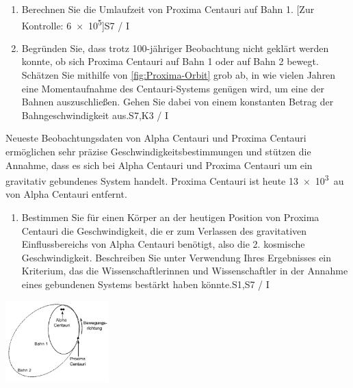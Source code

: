 \begin{aufgabe}[sidebyside, sidebyside align = top,righthand width=3cm]
	\begin{enumerate}
	 	\item Berechnen Sie die Umlaufzeit von Proxima Centauri auf Bahn 1.\newline
		 \hfill [Zur Kontrolle: \SI{6e5}{\year}]\newline \hfill S7 / I
		\item Begründen Sie, dass trotz 100-jähriger Beobachtung nicht geklärt werden konnte, ob sich Proxima Centauri auf Bahn 1 oder auf Bahn 2 bewegt. Schätzen Sie mithilfe von \cref{fig:Proxima-Orbit} grob ab, in wie vielen Jahren eine Momentaufnahme des Centauri-Systems genügen wird, um eine der Bahnen auszuschließen. Gehen Sie dabei von einem konstanten Betrag der Bahngeschwindigkeit aus.\newline \hfill S7,K3 / I
	\end{enumerate}
	Neueste Beobachtungsdaten von Alpha Centauri und Proxima Centauri ermöglichen sehr präzise Geschwindigkeitsbestimmungen und stützen die Annahme, dass es sich bei Alpha Centauri und Proxima Centauri um ein gravitativ gebundenes System handelt. Proxima Centauri ist heute \SI{13e3}{\astronomicalunit} von Alpha Centauri entfernt.
	\begin{enumerate}[resume]
	 	\item Bestimmen Sie für einen Körper an der heutigen Position von Proxima Centauri die Geschwindigkeit, die er zum Verlassen des gravitativen Einflussbereichs von Alpha Centauri benötigt, also die 2. kosmische Geschwindigkeit. Beschreiben Sie unter Verwendung Ihres Ergebnisses ein Kriterium, das die Wissenschaftlerinnen und Wissenschaftler in der Annahme eines gebundenen Systems bestärkt haben könnte.\newline \hfill S1,S7 / I
	\end{enumerate}
	\tcblower
		\centering
		\includegraphics[width=0.3\textwidth]{Bilder/Proxima_orbits.jpg}{}
		\label{fig:Proxima-Orbit}
\end{aufgabe}


